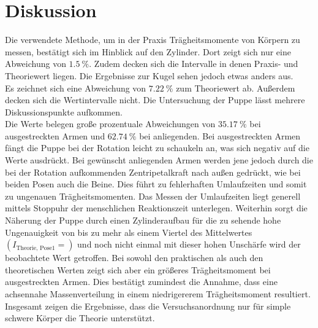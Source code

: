 \section{Diskussion}
\label{sec:Diskussion}
Die verwendete Methode, um in der Praxis Trägheitsmomente von Körpern zu messen, bestätigt sich im Hinblick auf den Zylinder.
Dort zeigt sich nur eine Abweichung von $\SI{1.5}{\percent}$.
Zudem decken sich die Intervalle in denen Praxis- und Theoriewert liegen.
Die Ergebnisse zur Kugel sehen jedoch etwas anders aus.\\
Es zeichnet sich eine Abweichung von $\SI{7.22}{\percent}$ zum Theoriewert ab.
Außerdem decken sich die Wertintervalle nicht.
Die Untersuchung der Puppe lässt mehrere Diskussionspunkte aufkommen.\\
Die Werte belegen große prozentuale Abweichungen von $\SI{35.17}{\percent}$ bei ausgestreckten Armen und $\SI{62.74}{\percent}$ bei anliegenden.
Bei ausgestreckten Armen fängt die Puppe bei der Rotation leicht zu schaukeln an, was sich negativ auf die Werte ausdrückt.
Bei gewünscht anliegenden Armen werden jene jedoch durch die bei der Rotation aufkommenden Zentripetalkraft nach außen gedrückt, wie bei beiden Posen auch die Beine.
Dies führt zu fehlerhaften Umlaufzeiten und somit zu ungenauen Trägheitsmomenten.
Das Messen der Umlaufzeiten liegt generell mittels Stoppuhr der menschlichen Reaktionszeit unterlegen.
Weiterhin sorgt die Näherung der Puppe durch einen Zylinderaufbau für die zu sehende hohe Ungenauigkeit von bis zu mehr als einem Viertel des Mittelwertes $(I_{\text{Theorie, Pose1}} = )$ und noch nicht einmal mit dieser hohen Unschärfe wird der beobachtete Wert getroffen.
Bei sowohl den praktischen als auch den theoretischen Werten zeigt sich aber ein größeres Trägheitsmoment bei ausgestreckten Armen.
Dies bestätigt zumindest die Annahme, dass eine achsennahe Massenverteilung in einem niedrigererem Trägheitsmoment resultiert.\\
Insgesamt zeigen die Ergebnisse, dass die Versuchsanordnung nur für simple schwere Körper die Theorie unterstützt.

